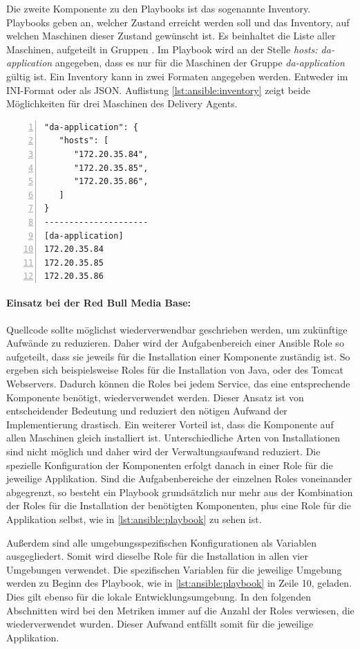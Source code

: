 Die zweite Komponente zu den Playbooks ist das sogenannte Inventory. Playbooks geben an, welcher Zustand erreicht werden soll und das Inventory, auf welchen Maschinen dieser Zustand gewünscht ist. Es beinhaltet die Liste aller Maschinen, aufgeteilt in Gruppen \cite{hall2013}. Im Playbook wird an der Stelle \textit{hosts: da-application} angegeben, dass es nur für die Maschinen der Gruppe \textit{da-application} gültig ist. Ein Inventory kann in zwei Formaten angegeben werden. Entweder im INI-Format oder als JSON. Auflistung \ref{lst:ansible:inventory} zeigt beide Möglichkeiten für drei Maschinen des Delivery Agents.

\begin{lstlisting}[style=code,numbers=left,caption={Beispiele: Ansible Inventory des Delivery Agent},label={lst:ansible:inventory}]
"da-application": {
   "hosts": [
      "172.20.35.84",
      "172.20.35.85",
      "172.20.35.86",
   ]
}
---------------------
[da-application]
172.20.35.84
172.20.35.85
172.20.35.86
\end{lstlisting}


\paragraph{Einsatz bei der Red Bull Media Base:}
Quellcode sollte möglichst wiederverwendbar geschrieben werden, um zukünftige Aufwände zu reduzieren. Daher wird der Aufgabenbereich einer Ansible Role so aufgeteilt, dass sie jeweils für die Installation einer Komponente zuständig ist. So ergeben sich beispielsweise Roles für die Installation von Java, oder des Tomcat Webservers. Dadurch können die Roles bei jedem Service, das eine entsprechende Komponente benötigt, wiederverwendet werden. Dieser Ansatz ist von entscheidender Bedeutung und reduziert den nötigen Aufwand der Implementierung drastisch. Ein weiterer Vorteil ist, dass die Komponente auf allen Maschinen gleich installiert ist. Unterschiedliche Arten von Installationen sind nicht möglich und daher wird der Verwaltungsaufwand reduziert. Die spezielle Konfiguration der Komponenten erfolgt danach in einer Role für die jeweilige Applikation. Sind die Aufgabenbereiche der einzelnen Roles voneinander abgegrenzt, so besteht ein Playbook grundsätzlich nur mehr aus der Kombination der Roles für die Installation der benötigten Komponenten, plus eine Role für die Applikation selbst, wie in \autoref{lst:ansible:playbook} zu sehen ist.

Außerdem sind alle umgebungsspezifischen Konfigurationen als Variablen ausgegliedert. Somit wird dieselbe Role für die Installation in allen vier Umgebungen verwendet. Die spezifischen Variablen für die jeweilige Umgebung werden zu Beginn des Playbook, wie in \autoref{lst:ansible:playbook} in Zeile 10, geladen. Dies gilt ebenso für die lokale Entwicklungsumgebung. In den folgenden Abschnitten wird bei den Metriken immer auf die Anzahl der Roles verwiesen, die wiederverwendet wurden. Dieser Aufwand entfällt somit für die jeweilige Applikation.

